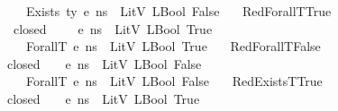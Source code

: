 \begin{isabellebody}
\ \ \ \ \ {\isasymLambda}{\isacharcomma}{\kern0pt}{\isasymGamma}{\isacharcomma}{\kern0pt}{\isasymOmega}\ {\isasymturnstile}\ {\isasymlangle}Exists\ ty\ e{\isacharcomma}{\kern0pt}\ n{\isacharunderscore}{\kern0pt}s{\isasymrangle}\ {\isasymDown}\ LitV\ {\isacharparenleft}{\kern0pt}LBool\ False{\isacharparenright}{\kern0pt}{\isachardoublequoteclose}\isanewline
\isanewline
\ \ {\isacharbar}{\kern0pt}\ RedForallT{\isacharunderscore}{\kern0pt}True{\isacharcolon}{\kern0pt}\isanewline
\ \ \ \ {\isachardoublequoteopen}{\isasymlbrakk}{\isasymAnd}{\isasymtau}{\isachardot}{\kern0pt}\ closed\ {\isasymtau}\ {\isasymLongrightarrow}\ {\isasymLambda}{\isacharcomma}{\kern0pt}{\isasymGamma}{\isacharcomma}{\kern0pt}{\isacharparenleft}{\kern0pt}{\isasymtau}{\isacharhash}{\kern0pt}{\isasymOmega}{\isacharparenright}{\kern0pt}\ {\isasymturnstile}\ {\isasymlangle}e{\isacharcomma}{\kern0pt}\ n{\isacharunderscore}{\kern0pt}s{\isasymrangle}\ {\isasymDown}\ LitV\ {\isacharparenleft}{\kern0pt}LBool\ True{\isacharparenright}{\kern0pt}\ {\isasymrbrakk}\ {\isasymLongrightarrow}\ \isanewline
\ \ \ \ \ {\isasymLambda}{\isacharcomma}{\kern0pt}{\isasymGamma}{\isacharcomma}{\kern0pt}{\isasymOmega}\ {\isasymturnstile}\ {\isasymlangle}ForallT\ e{\isacharcomma}{\kern0pt}\ n{\isacharunderscore}{\kern0pt}s{\isasymrangle}\ {\isasymDown}\ LitV\ {\isacharparenleft}{\kern0pt}LBool\ True{\isacharparenright}{\kern0pt}{\isachardoublequoteclose}\isanewline
\ \ {\isacharbar}{\kern0pt}\ RedForallT{\isacharunderscore}{\kern0pt}False{\isacharcolon}{\kern0pt}\isanewline
\ \ \ \ {\isachardoublequoteopen}{\isasymlbrakk}closed\ {\isasymtau}{\isacharsemicolon}{\kern0pt}\ {\isasymLambda}{\isacharcomma}{\kern0pt}{\isasymGamma}{\isacharcomma}{\kern0pt}{\isacharparenleft}{\kern0pt}{\isasymtau}{\isacharhash}{\kern0pt}{\isasymOmega}{\isacharparenright}{\kern0pt}\ {\isasymturnstile}\ {\isasymlangle}e{\isacharcomma}{\kern0pt}\ n{\isacharunderscore}{\kern0pt}s{\isasymrangle}\ {\isasymDown}\ LitV\ {\isacharparenleft}{\kern0pt}LBool\ False{\isacharparenright}{\kern0pt}\ {\isasymrbrakk}\ {\isasymLongrightarrow}\isanewline
\ \ \ \ \ {\isasymLambda}{\isacharcomma}{\kern0pt}{\isasymGamma}{\isacharcomma}{\kern0pt}{\isasymOmega}\ {\isasymturnstile}\ {\isasymlangle}ForallT\ e{\isacharcomma}{\kern0pt}\ n{\isacharunderscore}{\kern0pt}s{\isasymrangle}\ {\isasymDown}\ LitV\ {\isacharparenleft}{\kern0pt}LBool\ False{\isacharparenright}{\kern0pt}{\isachardoublequoteclose}\isanewline
\ \ {\isacharbar}{\kern0pt}\ RedExistsT{\isacharunderscore}{\kern0pt}True{\isacharcolon}{\kern0pt}\isanewline
\ \ \ \ {\isachardoublequoteopen}{\isasymlbrakk}closed\ {\isasymtau}{\isacharsemicolon}{\kern0pt}\ {\isasymLambda}{\isacharcomma}{\kern0pt}{\isasymGamma}{\isacharcomma}{\kern0pt}{\isacharparenleft}{\kern0pt}{\isasymtau}{\isacharhash}{\kern0pt}{\isasymOmega}{\isacharparenright}{\kern0pt}\ {\isasymturnstile}\ {\isasymlangle}e{\isacharcomma}{\kern0pt}\ n{\isacharunderscore}{\kern0pt}s{\isasymrangle}\ {\isasymDown}\ LitV\ {\isacharparenleft}{\kern0pt}LBool\ True{\isacharparenright}{\kern0pt}\ {\isasymrbrakk}\ {\isasymLongrightarrow}\isanewline

\end{isabellebody}
